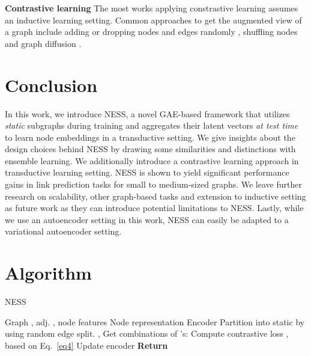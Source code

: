 \documentclass{article}
\begin{document}
\textbf{Contrastive learning} The most works applying constrastive learning assumes an inductive learning setting.  Common approaches to get the augmented view of a graph include adding or dropping nodes and edges randomly \citep{xu2021infogcl, you2020graph, zhu2020deep, papp2021dropgnn, rong2020dropedge}, shuffling nodes \citep{velickovic2019deep} and graph diffusion \cite{hassani2020contrastive}.






\section{Conclusion}
In this work, we introduce NESS, a novel GAE-based framework that utilizes \textit{static} subgraphs during training and aggregates their latent vectors \textit{at test time} to learn node embeddings in a transductive setting. We give insights about the design choices behind NESS by drawing some similarities and distinctions with ensemble learning. We additionally introduce a contrastive learning approach in transductive learning setting. NESS is shown to yield significant performance gains in link prediction tasks for small to medium-sized graphs. We leave further research on scalability, other graph-based tasks and extension to inductive setting as future work as they can introduce potential limitations to NESS. Lastly, while we use an autoencoder setting in this work, NESS can easily be adapted to a variational autoencoder setting.




\clearpage




\newpage
\appendix

\renewcommand\thefigure{A\arabic{figure}}
\renewcommand\thetable{A\arabic{table}}
\setcounter{figure}{0} 
\setcounter{table}{0} 


\section{Algorithm}

\begin{algorithm}[h]
   \caption{NESS}
   \label{alg:ness}
\begin{algorithmic}
    Graph , adj. , node features 
    Node representation 
    Encoder 
   \STATE Partition  into  static  by using random edge split.
    \STATE , 
            \STATE   
            \STATE   
            \STATE   
            \STATE   
        \ENDFOR
            \STATE Get combinations of 's: 
            \STATE Compute contrastive loss , based on Eq.~\ref{eq4}
            \STATE 
        \ENDIF
    \STATE Update encoder 
   \ENDFOR
    \STATE \bfseries  Return 

\end{algorithmic}
\end{algorithm}
\end{document}
